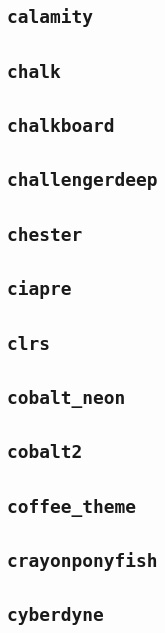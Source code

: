 \subsection{\texttt{calamity}}
\newpage
\subsection{\texttt{chalk}}
\newpage
\subsection{\texttt{chalkboard}}
\newpage
\subsection{\texttt{challengerdeep}}
\newpage
\subsection{\texttt{chester}}
\newpage
\subsection{\texttt{ciapre}}
\newpage
\subsection{\texttt{clrs}}
\newpage
\subsection{\texttt{cobalt\_neon}}
\newpage
\subsection{\texttt{cobalt2}}
\newpage
\subsection{\texttt{coffee\_theme}}
\newpage
\subsection{\texttt{crayonponyfish}}
\newpage
\subsection{\texttt{cyberdyne}}
\newpage
